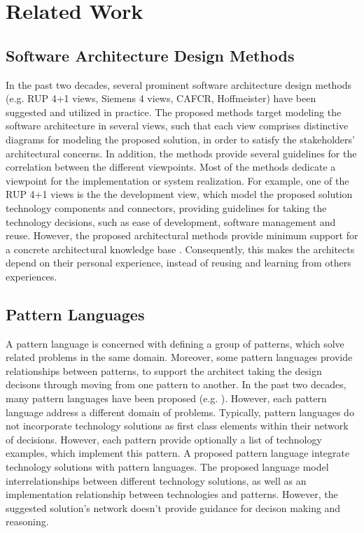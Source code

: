 \documentclass[conference]{IEEEtran}
\begin{document}
\section{Related Work}
\label{sec:related}
\subsection{Software Architecture Design Methods}
In the past two decades, several prominent software architecture design methods
(e.g. RUP 4+1 views, Siemens 4 views, CAFCR, Hoffmeister) have been suggested
and utilized in practice. The proposed methods target modeling the software architecture in
several views, such that each view comprises distinctive diagrams for modeling
the proposed solution, in order to satisfy the stakeholders' architectural
concerns. In addition, the methods provide several guidelines for the
correlation between the different viewpoints. Most of the methods dedicate a
viewpoint for the implementation or system realization. For example, one of the
RUP 4+1 views is the the development view, which model the proposed solution
technology components and connectors, providing guidelines for taking the
technology decisions, such as ease of development, software management and
reuse. However, the proposed architectural methods provide minimum support for a
concrete architectural knowledge base \cite{MethodsSurveyKruchten}.
Consequently, this makes the architects depend on their personal experience,
instead of reusing and learning from others experiences.
\subsection{Pattern Languages}
A pattern language is concerned with defining a group of patterns, which solve
related problems in the same domain. Moreover, some pattern languages provide
relationships between patterns, to support the architect taking the design
decisons through moving from one pattern to another. In the past two decades,
many pattern languages have been proposed (e.g. \cite{Buschmann1996}). However,
each pattern language address a different domain of problems. Typically, pattern
languages do not incorporate technology solutions as first class elements within
their network of decisions. However, each pattern provide optionally a list of
technology examples, which implement this pattern. A proposed pattern language
\cite{hezavehi2011pla} integrate technology solutions with pattern languages.
The proposed language model interrelationships between different technology
solutions, as well as an implementation relationship between technologies and
patterns. However, the suggested solution's network doesn't provide guidance for
decison making and reasoning.
\end{document}

